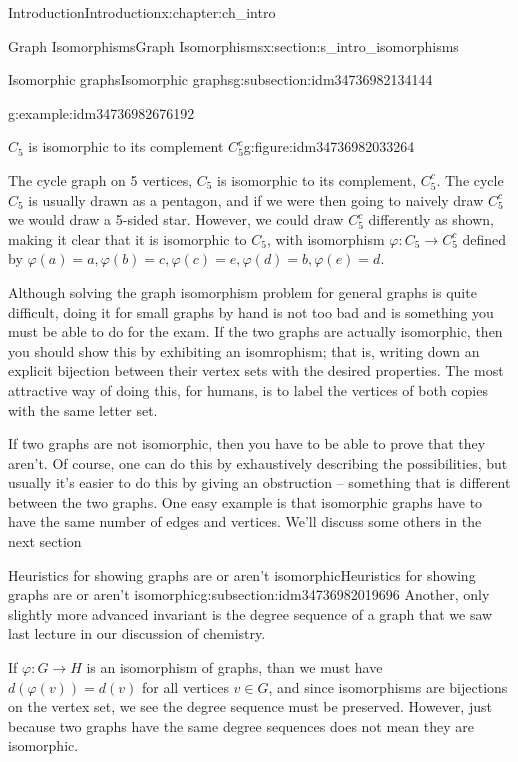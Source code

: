 \documentclass[oneside,10pt,]{book}
\numberwithin{equation}{section}
\begin{document}
\begin{chapterptx}{Introduction}{}{Introduction}{}{}{x:chapter:ch_intro}
\begin{sectionptx}{Graph Isomorphisms}{}{Graph Isomorphisms}{}{}{x:section:s_intro_isomorphisms}
\begin{subsectionptx}{Isomorphic graphs}{}{Isomorphic graphs}{}{}{g:subsection:idm34736982134144}
\begin{example}{}{g:example:idm34736982676192}
\begin{figureptx}{\(C_5\) is isomorphic to its complement \(C_5^c\)}{g:figure:idm34736982033264}{}
\begin{image}{0.05}{0.9}{0.05}
\end{image}%
\tcblower
\end{figureptx}%
The cycle graph on 5 vertices, \(C_5\) is isomorphic to its complement, \(C_5^c\).  The cycle \(C_5\) is usually drawn as a pentagon, and if we were then going to naively draw \(C_5^c\) we would draw a 5-sided star.  However, we could draw \(C_5^c\) differently as shown, making it clear that it is isomorphic to \(C_5\), with isomorphism \(\varphi:C_5\to C_5^c\) defined by \(\varphi(a)=a, \varphi(b)=c, \varphi(c)=e, \varphi(d)=b, \varphi(e)=d\).%
\end{example}
Although solving the graph isomorphism problem for general graphs is quite difficult, doing it for small graphs by hand is not too bad and is something you must be able to do for the exam.  If the two graphs are actually isomorphic, then you should show this by exhibiting an isomrophism; that is, writing down an explicit bijection between their vertex sets with the desired properties. The most attractive way of doing this, for humans, is to label the vertices of both copies with the same letter set.%
\par
If two graphs are not isomorphic, then you have to be able to prove that they aren't. Of course, one can do this by exhaustively describing the possibilities, but usually it's easier to do this by giving an obstruction – something that is different between the two graphs. One easy example is that isomorphic graphs have to have the same number of edges and vertices. We'll discuss some others in the next section%
\end{subsectionptx}
%
%
\typeout{************************************************}
\typeout{************************************************}
%
\begin{subsectionptx}{Heuristics for showing graphs are or aren't isomorphic}{}{Heuristics for showing graphs are or aren't isomorphic}{}{}{g:subsection:idm34736982019696}
Another, only slightly more advanced invariant is the degree sequence of a graph that we saw last lecture in our discussion of chemistry.%
\par
If \(\varphi:G\to H\) is an isomorphism of graphs, than we must have \(d(\varphi(v))=d(v)\) for all vertices \(v\in G\), and since isomorphisms are bijections on the vertex set, we see the degree sequence must be preserved.  However, just because two graphs have the same degree sequences does not mean they are isomorphic.%
\par

\end{subsectionptx}
\end{sectionptx}
\end{chapterptx}
\end{document}

